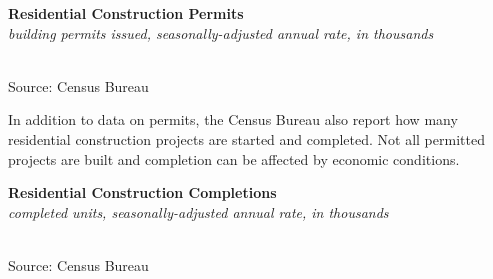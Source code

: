 \documentclass{report}
\makeatletter
\newcommand{\tbllink}[1]{\href{https://raw.githubusercontent.com/bdecon/US-chartbook/master/chartbook/data/#1}{\faTable}}
\newcommand*\short[1]{\expandafter\@gobbletwo\number\numexpr#1\relax}
\newcommand{\dateaxisticks}{
		date coordinates in=x, axis line style={draw=none},
		xmax={2022-03-15},
		max space between ticks=40,	    
		xtick={{1990-01-01}, {1992-01-01}, {1994-01-01}, 
			{1996-01-01}, {1998-01-01}, {2000-01-01}, 
			{2002-01-01}, {2004-01-01}, {2006-01-01},
			{2008-01-01}, {2010-01-01}, {2012-01-01}, {2014-01-01},
		    {2016-01-01}, {2018-01-01}, {2020-01-01}, {2022-01-01}, 
		    {2024-01-01}, {2026-01-01}},
		minor xtick={{1989-01-01}, {1991-01-01}, {1993-01-01},
			{1995-01-01}, {1997-01-01}, {1999-01-01}, 
			{2001-01-01}, {2003-01-01}, {2005-01-01}, {2007-01-01},
		    {2009-01-01}, {2011-01-01}, {2013-01-01}, {2015-01-01},
		    {2017-01-01}, {2019-01-01}, {2021-01-01}, {2023-01-01}, 
		    {2025-01-01}, {2027-01-01}},
		enlarge y limits={0.06}, enlarge x limits={0.01},
		}
\newcommand{\bbar}[2]{extra #1 ticks = {{#2}}, extra #1 tick labels = ,
		extra #1 tick style = {grid=major, grid style={thick, black!25}},}
\newcommand{\stdline}[4]{\addplot[very thick, no markers, color=#1] 
		table [x=#2, y=#3, col sep=comma] {#4};	}
\newcommand{\rbars}{
		\fill[color=black!10] (axis cs:{1990-07-01},\pgfkeysvalueof{/pgfplots/ymin}) rectangle 
			(axis cs:{1991-03-01}, \pgfkeysvalueof{/pgfplots/ymax});
		\fill[color=black!10] (axis cs:{2007-12-01},\pgfkeysvalueof{/pgfplots/ymin}) rectangle 
			(axis cs:{2009-07-01}, \pgfkeysvalueof{/pgfplots/ymax});
		\fill[color=black!10] (axis cs:{2001-03-01},\pgfkeysvalueof{/pgfplots/ymin}) rectangle 
			(axis cs:{2001-11-01}, \pgfkeysvalueof{/pgfplots/ymax});
		\fill[color=black!10] (axis cs:{2020-02-01},\pgfkeysvalueof{/pgfplots/ymin}) rectangle 
			(axis cs:{2020-05-01}, \pgfkeysvalueof{/pgfplots/ymax});}
\makeatother
\begin{document}
{\begin{minipage}{0.76\textwidth}
\normalsize{\textbf{Residential Construction Permits}}\\
\footnotesize{\textit{building permits issued, seasonally-adjusted annual rate, in thousands}}\\
\hspace*{-2mm} \\
\footnotesize{Source: Census Bureau} \hfill \tbllink{permits_total.csv}
\vspace{2mm}

\small In addition to data on permits, the Census Bureau also report how many residential construction projects are started and completed. Not all permitted projects are built and completion can be affected by economic conditions. 
\vspace{1mm}

\normalsize{\textbf{Residential Construction Completions}}\\
\footnotesize{\textit{completed units, seasonally-adjusted annual rate, in thousands}}\\
\hspace*{-2mm} \\
\footnotesize{Source: Census Bureau} \hfill \tbllink{permits_total.csv}
\vspace{2mm}

\small 
\vspace{1mm}


\end{minipage}}
\end{document}
